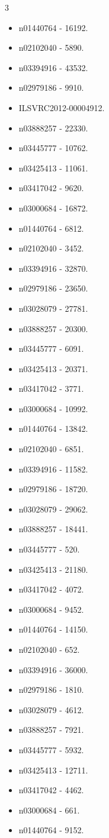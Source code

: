 \begin{multicols}{3}
\begin{itemize}
\item n01440764 - 16192.
\item n02102040 - 5890.
\item n03394916 - 43532.
\item n02979186 - 9910.
\item ILSVRC2012-00004912.
\item n03888257 - 22330.
\item n03445777 - 10762.
\item n03425413 - 11061.
\item n03417042 - 9620.
\item n03000684 - 16872.
\item n01440764 - 6812.
\item n02102040 - 3452.
\item n03394916 - 32870.
\item n02979186 - 23650.
\item n03028079 - 27781.
\item n03888257 - 20300.
\item n03445777 - 6091.
\item n03425413 - 20371.
\item n03417042 - 3771.
\item n03000684 - 10992.
\item n01440764 - 13842.
\item n02102040 - 6851.
\item n03394916 - 11582.
\item n02979186 - 18720.
\item n03028079 - 29062.
\item n03888257 - 18441.
\item n03445777 - 520.
\item n03425413 - 21180.
\item n03417042 - 4072.
\item n03000684 - 9452.
\item n01440764 - 14150.
\item n02102040 - 652.
\item n03394916 - 36000.
\item n02979186 - 1810.
\item n03028079 - 4612.
\item n03888257 - 7921.
\item n03445777 - 5932.
\item n03425413 - 12711.
\item n03417042 - 4462.
\item n03000684 - 661.
\item n01440764 - 9152.

\end{itemize}
\end{multicols}
